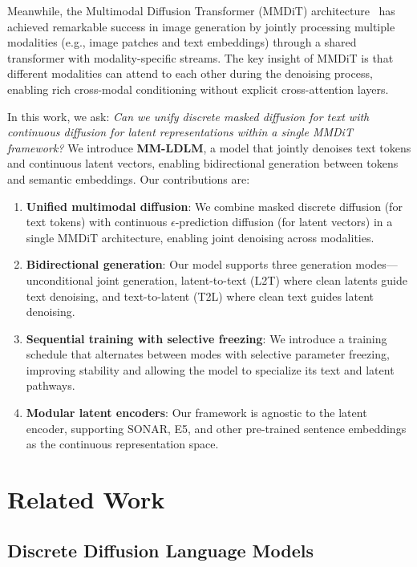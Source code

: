\documentclass{article}
\begin{document}
Meanwhile, the Multimodal Diffusion Transformer (MMDiT) architecture~\citep{esser2024sd3} has achieved remarkable success in image generation by jointly processing multiple modalities (e.g., image patches and text embeddings) through a shared transformer with modality-specific streams. The key insight of MMDiT is that different modalities can attend to each other during the denoising process, enabling rich cross-modal conditioning without explicit cross-attention layers.

In this work, we ask: \emph{Can we unify discrete masked diffusion for text with continuous diffusion for latent representations within a single MMDiT framework?} We introduce \textbf{MM-LDLM}, a model that jointly denoises text tokens and continuous latent vectors, enabling bidirectional generation between tokens and semantic embeddings. Our contributions are:

\begin{enumerate}[leftmargin=*]
    \item \textbf{Unified multimodal diffusion}: We combine masked discrete diffusion (for text tokens) with continuous $\epsilon$-prediction diffusion (for latent vectors) in a single MMDiT architecture, enabling joint denoising across modalities.
    \item \textbf{Bidirectional generation}: Our model supports three generation modes---unconditional joint generation, latent-to-text (L2T) where clean latents guide text denoising, and text-to-latent (T2L) where clean text guides latent denoising.
    \item \textbf{Sequential training with selective freezing}: We introduce a training schedule that alternates between modes with selective parameter freezing, improving stability and allowing the model to specialize its text and latent pathways.
    \item \textbf{Modular latent encoders}: Our framework is agnostic to the latent encoder, supporting SONAR, E5, and other pre-trained sentence embeddings as the continuous representation space.
\end{enumerate}

\section{Related Work}\label{sec:related}

\subsection{Discrete Diffusion Language Models}
\end{document}

